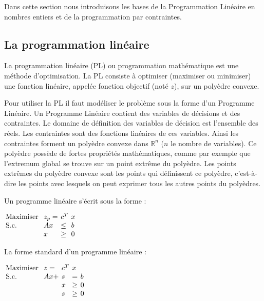 Dans cette section nous introduisons les bases de la Programmation Linéaire en nombres entiers et de la programmation par contraintes.


\subsection{La programmation linéaire \label{subsec:PL}}
La programmation linéaire (PL) ou programmation mathématique est une méthode d'optimisation.
La PL consiste à optimiser (maximiser ou minimiser) une fonction linéaire, appelée fonction objectif (noté $z$), sur un polyèdre convexe.

Pour utiliser la PL il faut modéliser le problème sous la forme d'un Programme Linéaire.
Un Programme Linéaire contient des variables de décisions et des contraintes.
Le domaine de définition des variables de décision est l'ensemble des réels.
Les contraintes sont des fonctions linéaires de ces variables.
Ainsi les contraintes forment un polyèdre convexe dans $\mathbb{R}^n$ ($n$ le nombre de variables).
Ce polyèdre possède de fortes propriétés mathématiques, comme par exemple que l’extremum global se trouve sur un point extrême du polyèdre.
Les points extrêmes du polyèdre convexe sont les points qui définissent ce polyèdre, c'est-à-dire les points avec lesquels on peut exprimer tous les autres points du polyèdres.
\begin{mydef}
Un programme linéaire  s'écrit sous la forme : \\
\begin{center}
$
\arraycolsep=2pt
\begin{array}{llll}
\text{Maximiser } & z_p = &c^T&x\\
\text{S.c. } & Ax & \leq & b \\
& x & \geq & 0
\end{array}
$
\end{center}

\label{def:PL}
\end{mydef}

\begin{mydef}
La forme standard d'un programme linéaire : \\
\begin{center}
$
\arraycolsep=2pt
\begin{array}{lllll}
\text{Maximiser } & z =& c^T&x &\\
\text{S.c. } & Ax +& s  & = & b \\
& &x & \geq & 0\\
& &s & \geq & 0
\end{array}
$
\end{center}

\label{def:PL:standard}
\end{mydef}



